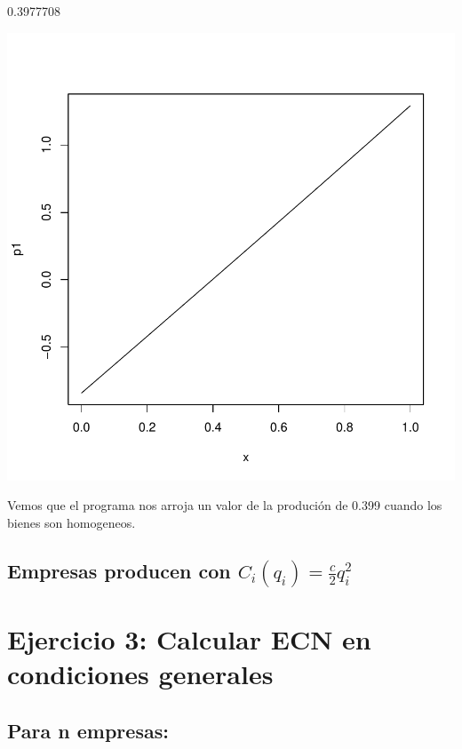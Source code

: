 \documentclass{article}
\begin{document}
\begin{Schunk}
\begin{Soutput}
[1] 0.3977708
\end{Soutput}
\end{Schunk}
\includegraphics{PUTAPRUEBA-002}



Vemos que el programa nos arroja un valor de la produción de 0.399 cuando los bienes son homogeneos.

\subsection{Empresas producen con $C_i(q_i)=\frac{c}{2}q_i^2$}

\section{Ejercicio 3: Calcular ECN en condiciones generales} 

\subsection{Para n empresas:}
\end{document}
